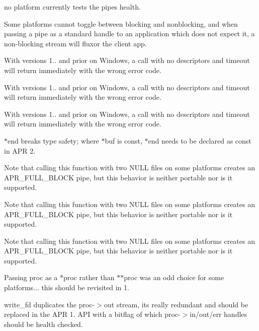 \begin{DoxyRefList}
no platform currently tests the pipes health.  
\item[\label{bug__bug000002}%
\Hypertarget{bug__bug000002}%
Member \mbox{\hyperlink{group__apr__time_ga57bfe39a9516843a151a65cd02f84616}{A\+P\+R\+\_\+\+D\+E\+C\+L\+A\+RE}} (apr\+\_\+status\+\_\+t) apr\+\_\+time\+\_\+ansi\+\_\+put(apr\+\_\+time\+\_\+t $\ast$result]Some platforms cannot toggle between blocking and nonblocking, and when passing a pipe as a standard handle to an application which does not expect it, a non-\/blocking stream will fluxor the client app. 

With versions 1.. and prior on Windows, a call with no descriptors and timeout will return immediately with the wrong error code. 

With versions 1.. and prior on Windows, a call with no descriptors and timeout will return immediately with the wrong error code. 

With versions 1.. and prior on Windows, a call with no descriptors and timeout will return immediately with the wrong error code. 

$\ast$end breaks type safety; where $\ast$buf is const, $\ast$end needs to be declared as const in A\+PR 2. 

Note that calling this function with two N\+U\+LL files on some platforms creates an A\+P\+R\+\_\+\+F\+U\+L\+L\+\_\+\+B\+L\+O\+CK pipe, but this behavior is neither portable nor is it supported.

Note that calling this function with two N\+U\+LL files on some platforms creates an A\+P\+R\+\_\+\+F\+U\+L\+L\+\_\+\+B\+L\+O\+CK pipe, but this behavior is neither portable nor is it supported.

Note that calling this function with two N\+U\+LL files on some platforms creates an A\+P\+R\+\_\+\+F\+U\+L\+L\+\_\+\+B\+L\+O\+CK pipe, but this behavior is neither portable nor is it supported.

Passing proc as a $\ast$proc rather than $\ast$$\ast$proc was an odd choice for some platforms... this should be revisited in 1.  
\item[\label{bug__bug000011}%
\Hypertarget{bug__bug000011}%
Member \mbox{\hyperlink{group__apr__time_ga82e8a0064bc8dd25ef73f39ea428a585}{A\+P\+R\+\_\+\+D\+E\+C\+L\+A\+RE}} (void) apr\+\_\+sleep(apr\+\_\+interval\+\_\+time\+\_\+t t)]write\+\_\+fd duplicates the proc-\/$>$out stream, it\textquotesingle{}s really redundant and should be replaced in the A\+PR 1. A\+PI with a bitflag of which proc-\/$>$in/out/err handles should be health checked. 


\end{DoxyRefList}
